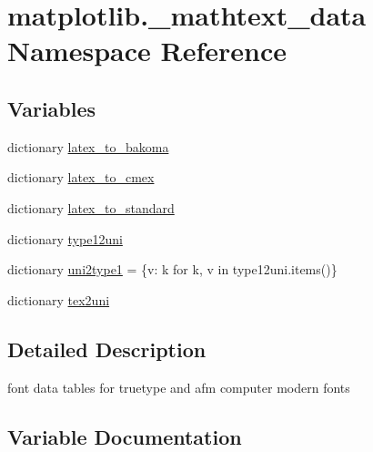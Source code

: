 \hypertarget{namespacematplotlib_1_1__mathtext__data}{}\section{matplotlib.\+\_\+mathtext\+\_\+data Namespace Reference}
\label{namespacematplotlib_1_1__mathtext__data}
\subsection*{Variables}
\begin{DoxyCompactItemize}
\item 
dictionary \hyperlink{namespacematplotlib_1_1__mathtext__data_a70579c64afccf551d871b82bc44bbdbc}{latex\+\_\+to\+\_\+bakoma}
\item 
dictionary \hyperlink{namespacematplotlib_1_1__mathtext__data_a993f6ae0d26ec3770138abd7ecc7df62}{latex\+\_\+to\+\_\+cmex}
\item 
dictionary \hyperlink{namespacematplotlib_1_1__mathtext__data_af4354164cdbc803e3a53e5d3797e0dea}{latex\+\_\+to\+\_\+standard}
\item 
dictionary \hyperlink{namespacematplotlib_1_1__mathtext__data_aaf1d27ccf75a1f79b243098395fa1e43}{type12uni}
\item 
dictionary \hyperlink{namespacematplotlib_1_1__mathtext__data_a1d08aaf37304f0a1a5455a27b9ae185c}{uni2type1} = \{v\+: k for k, v in type12uni.\+items()\}
\item 
dictionary \hyperlink{namespacematplotlib_1_1__mathtext__data_a4be847ad3022e2d484acdc3e4e35bd8f}{tex2uni}
\end{DoxyCompactItemize}


\subsection{Detailed Description}
\begin{DoxyVerb}font data tables for truetype and afm computer modern fonts
\end{DoxyVerb}
 

\subsection{Variable Documentation}
\mbox{\label{namespacematplotlib_1_1__mathtext__data_a70579c64afccf551d871b82bc44bbdbc}} 
